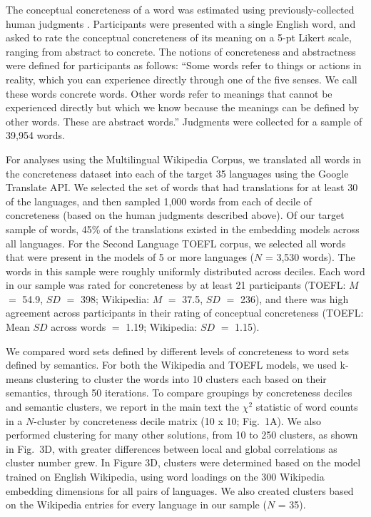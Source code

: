 \documentclass[9pt,twocolumn,twoside,lineno]{pnas-new}
\begin{document}
{The conceptual concreteness of a word was estimated using previously-collected human judgments \cite{brysbaert2014concreteness}. Participants were presented with a single English word, and asked to rate the conceptual concreteness of its meaning on a 5-pt Likert scale, ranging from abstract to concrete.  The notions of concreteness and abstractness were defined for participants as follows: ``Some words refer to things or actions in reality, which you can experience directly through one of the five senses. We call these words concrete words. Other words refer to meanings that cannot be experienced directly but which we know because the meanings can be defined by other words. These are abstract words.'' Judgments were collected for a sample of 39,954 words.

For analyses using the Multilingual Wikipedia Corpus, we translated all words in the concreteness dataset into each of the target 35 languages using the Google Translate API. We selected the set of words that had translations for at least 30 of the languages, and then sampled 1,000 words from each of decile of concreteness (based on the human judgments described above). Of our target sample of words, 45\% of the translations existed in the embedding models across all languages.  For the Second Language TOEFL corpus, we selected all words that were present in the models of 5 or more languages ($N$ = 3,530 words). The words in this sample were roughly uniformly distributed across deciles.  Each word in our sample was rated for concreteness by at least 21 participants (TOEFL:  $M$  $=$ 54.9, $SD$ $=$  398; Wikipedia:  $M$  $=$ 37.5, $SD$ $=$ 236), and there was high agreement across participants in their rating of conceptual concreteness  (TOEFL: Mean $SD$ across words $=$  1.19; Wikipedia:  $SD$ $=$ 1.15).
 
 We compared word sets defined by different levels of concreteness to word sets defined by semantics. For both the Wikipedia and TOEFL models, we used k-means clustering \cite{hartigan1979algorithm} to cluster the words into 10 clusters each based on their semantics, through 50 iterations. To compare groupings by concreteness deciles and semantic clusters, we report in the main text the $\chi^2$ statistic of word counts in a $N$-cluster by concreteness decile matrix  (10 x 10; Fig.\ 1A). We also performed clustering for many other solutions, from 10 to 250 clusters, as shown in Fig.\ 3D, with greater differences between local and global correlations as cluster number grew. In Figure 3D, clusters were determined based on the model trained on English Wikipedia, using word loadings on the 300 Wikipedia embedding dimensions for all pairs of languages. We also created clusters based on the Wikipedia entries for every language in our sample ($N$ = 35).
 
}
\end{document}
